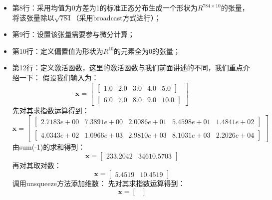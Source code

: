 \documentclass[UTF8]{article}
\begin{document}
\begin{itemize}
\item 第8行：采用均值为0方差为1的标准正态分布生成一个形状为$R^{784 \times 10}$的张量，将该张量除以$\sqrt{784}$（采用broadcast方式进行）；
\item 第9行：设置该张量需要参与微分计算；
\item 第10行：定义偏置值为形状为$R^{10}$的元素全为0的张量；
\item 第12行：定义激活函数，这里的激活函数与我们前面讲述的不同，我们重点介绍一下：
假设我们输入为：
\begin{equation}
\boldsymbol{x} = \begin{bmatrix}
\begin{bmatrix}
1.0 & 2.0 & 3.0 & 4.0 & 5.0
\end{bmatrix} \\
\begin{bmatrix}
6.0 & 7.0 & 8.0 & 9.0 & 10.0
\end{bmatrix}
\end{bmatrix}
\label{mlp-e3-input-x}
\end{equation}
先对其求指数运算得到：
\begin{equation}
\boldsymbol{x} = \begin{bmatrix}
\begin{bmatrix}
2.7183e+00 & 7.3891e+00 & 2.0086e+01 & 5.4598e+01 & 1.4841e+02
\end{bmatrix} \\
\begin{bmatrix}
4.0343e+02 & 1.0966e+03 & 2.9810e+03 & 8.1031e+03 & 2.2026e+04
\end{bmatrix}
\end{bmatrix}
\label{mlp-e3-input-x-exp}
\end{equation}
由sum(-1)的求和得到：
\begin{equation}
\boldsymbol{x} = \begin{bmatrix}
233.2042 & 34610.5703
\end{bmatrix}
\label{mlp-e3-input-x-exp-sum}
\end{equation}
再对其取对数：
\begin{equation}
\boldsymbol{x} = \begin{bmatrix}
5.4519 & 10.4519
\end{bmatrix}
\label{mlp-e3-input-x-exp-log}
\end{equation}
调用unsqueeze方法添加维数：
先对其求指数运算得到：
\begin{equation}
\boldsymbol{x} = \begin{bmatrix}

\end{bmatrix}
\end{equation}
\end{itemize}
\end{document}
